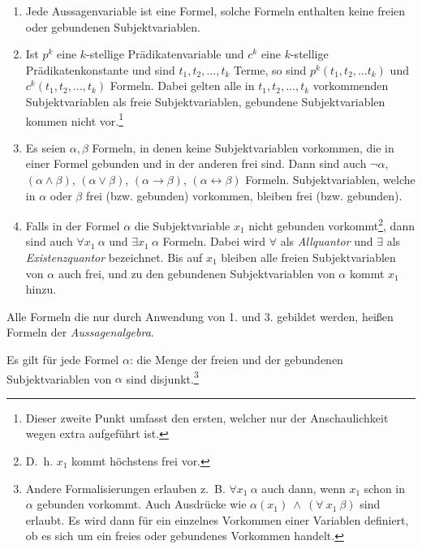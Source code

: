 \documentclass[a4paper,german,10pt,twoside]{book}
\theoremstyle{definition}
\theoremstyle{remark}
\begin{document}
\begin{enumerate}

\item Jede Aussagenvariable ist eine Formel, solche Formeln enthalten keine freien oder gebundenen Subjektvariablen. 
\item Ist $p^k$ eine $k$-stellige Pr{\"a}dikatenvariable und $c^k$ eine $k$-stellige Pr{\"a}dikatenkonstante und sind $t_1, t_2, \ldots, t_k$ Terme, so sind $p^k(t_1, t_2, \ldots t_k)$ und $c^k(t_1, t_2, \ldots, t_k)$ Formeln. Dabei gelten alle in 
$t_1, t_2, \ldots, t_k$ vorkommenden Subjektvariablen als freie Subjektvariablen, gebundene Subjektvariablen kommen nicht 
vor.\footnote{Dieser zweite Punkt umfasst den ersten, welcher nur der Anschaulichkeit wegen extra aufgef{\"u}hrt ist.} 

\item Es seien $\alpha, \beta$ Formeln, in denen keine Subjektvariablen vorkommen, die in einer Formel gebunden und in der anderen frei sind. Dann sind auch $\neg \alpha$, $(\alpha \land \beta)$, $(\alpha \lor \beta)$, $(\alpha \rightarrow \beta)$, $(\alpha \leftrightarrow \beta)$ Formeln. Subjektvariablen, welche in $\alpha$ oder $\beta$ frei (bzw. gebunden) vorkommen, bleiben frei (bzw. gebunden).

\item Falls in der Formel $\alpha$ die Subjektvariable $x_1$ nicht gebunden vorkommt\footnote{D.~h. $x_1$ kommt h{\"o}chstens frei vor.}, dann sind auch $\forall x_1~\alpha$ und $\exists x_1~\alpha$ Formeln. Dabei wird $\forall$ als
\emph{Allquantor} und $\exists$ als \emph{Existenzquantor} bezeichnet. Bis auf $x_1$ bleiben alle freien Subjektvariablen von $\alpha$ auch frei, und zu den gebundenen Subjektvariablen von $\alpha$ kommt $x_1$ hinzu. 

\end{enumerate}
Alle Formeln die nur durch Anwendung von 1. und 3. gebildet werden, hei{\ss}en Formeln der \emph{Aussagenalgebra}. 

\par
Es gilt f{\"u}r jede Formel $\alpha$: die Menge der freien und der gebundenen Subjektvariablen von $\alpha$ sind disjunkt.\footnote{Andere Formalisierungen erlauben z.~B. $\forall x_1~\alpha$ auch dann, wenn $x_1$ schon in $\alpha$ gebunden vorkommt. Auch Ausdr{\"u}cke wie $\alpha(x_1)~\land~(\forall~x_1~\beta)$ sind erlaubt. Es wird dann
f{\"u}r ein einzelnes Vorkommen einer Variablen definiert, ob es sich um ein freies oder gebundenes Vorkommen handelt.}
\end{document}
